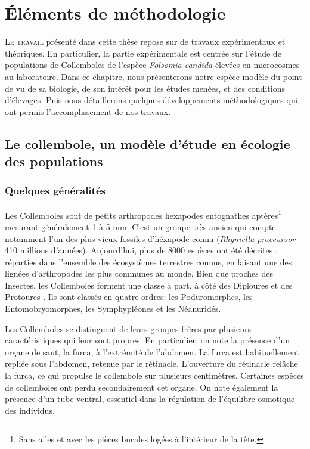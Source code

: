 \chapter{Éléments de méthodologie}
\label{chap:method}

\lettrine[lines=3]{L}{e travail} présenté dans cette thèse repose sur de travaux
expérimentaux et théoriques. En particulier, la partie expérimentale est centrée sur l'étude de
populations de Collemboles de l'espèce \textit{Folsomia candida} élevées en
microcosmes au laboratoire. Dans ce chapitre, nous présenterons notre espèce
modèle du point de vu de sa biologie, de son intérêt pour les études menées, et
des conditions d'élevages. Puis nous détaillerons quelques développements
méthodologiques qui ont permis l'accomplissement de nos travaux. 

\section{Le collembole, un modèle d'étude en écologie des populations}

\subsection{Quelques généralités}

Les Collemboles sont de petits arthropodes hexapodes entognathes
aptères\footnote{Sans ailes et avec les pièces bucales logées à l'intérieur de
la tête.} mesurant généralement 1 à 5 mm.
C'est un groupe très ancien qui compte notamment l'un des plus vieux fossiles d'héxapode connu (\textit{Rhyniella
praecursor} 410 millions d'années). Aujourd'hui, plus de 8000 espèces ont été
décrites \autocites{bellinger2014a}, réparties dans l'ensemble des écosystèmes
terrestres connus, en faisant une des lignées d'arthropodes les plus communes au
monde.
Bien que proches des Insectes, les Collemboles forment une classe à part, à côté des
Diploures et des Protoures \autocites{grimaldi2010a}. Ils sont
classés en quatre ordres: les Poduromorphes, les Entomobryomorphes, les
Symphypléones et les Néanuridés.

Les Collemboles se distinguent de leurs groupes frères par plusieurs
caractéristiques qui leur sont propres. En particulier, on note la présence
d'un organe de saut, la furca, à l'extrémité de l'abdomen. La furca est
habituellement repliée sous l'abdomen, retenue par le rétinacle. L'ouverture du
rétinacle relâche la furca, ce qui propulse le collembole sur plusieurs
centimètres. Certaines espèces de collemboles ont perdu secondairement cet
organe. On note également la présence d'un tube ventral, essentiel dans la
régulation de l'équilibre osmotique des individus.


